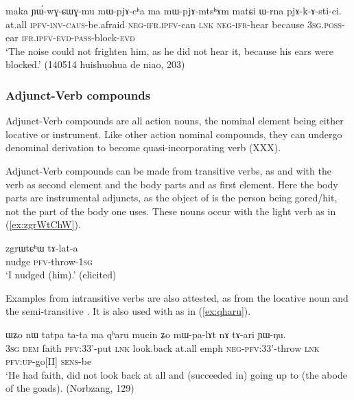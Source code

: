 \begin{exe}
\ex \label{ex:pjAkAstici}
\gll maka ɲɯ́-wɣ-ɕɯɣ-mu mɯ-pjɤ-cʰa ma mɯ-pjɤ-mtsʰɤm matɕi ɯ-rna pjɤ-k-ɤ-sti-ci. \\
at.all \textsc{ipfv}-\textsc{inv}-\textsc{caus}-be.afraid \textsc{neg}-\textsc{ifr.ipfv}-can \textsc{lnk} \textsc{neg}-\textsc{ifr}-hear because \textsc{3sg.poss}-ear \textsc{ifr.ipfv}-\textsc{evd}-\textsc{pass}-block-\textsc{evd} \\
\glt `The noise could not frighten him, as he did not hear it, because his ears were blocked.' (140514 huishuohua de niao, 203)
\end{exe}

\subsubsection{Adjunct-Verb compounds} \label{sec:adjunct.verb.compounds}
Adjunct-Verb compounds are all action nouns, the nominal element being either locative or instrument. Like other action nominal compounds, they can undergo denominal derivation to become quasi-incorporating verb (XXX).  

Adjunct-Verb compounds can be made from transitive verbs, as  and  with the verb  as second element and the body parts   and   as first element. Here the body parts are instrumental adjuncts, as the object of  is the person being gored/hit, not the part of the body one uses. These nouns occur with the light verb  as in (\ref{ex:zgrWtChW}). 

\begin{exe}
\ex \label{ex:zgrWtChW}
\gll zgrɯtɕʰɯ tɤ-lat-a \\
nudge \textsc{pfv}-throw-\textsc{1sg} \\
\glt `I nudged (him).' (elicited)
\end{exe}

Examples from intransitive verbs are also attested, as  from the locative noun  and the semi-transitive . It is also used with   as in (\ref{ex:qharu}).

\begin{exe}
\ex \label{ex:qharu}
\gll ɯʑo nɯ  tatpa ta-ta ma qʰaru mucin ʑo mɯ-pa-lɤt nɤ tɤ-ari ɲɯ-ŋu. \\
\textsc{3sg} \textsc{dem} faith \textsc{pfv}:3\fl{}3'-put \textsc{lnk} look.back at.all emph \textsc{neg}-\textsc{pfv}:3\fl{}3'-throw \textsc{lnk} \textsc{pfv}:\textsc{up}-go[II] \textsc{sens}-be \\
\glt `He had faith, did not look back at all and (succeeded in) going up to (the abode of the goads). (Norbzang, 129)
\end{exe}

